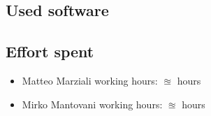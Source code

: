\documentclass{article}
\begin{document}
\subsection{Used software}


\subsection{Effort spent}
\begin{itemize}

\item Matteo Marziali working hours:  $\approxeq$ hours

\item Mirko Mantovani working hours:  $\approxeq$ hours



\end{itemize}
\end{document}

